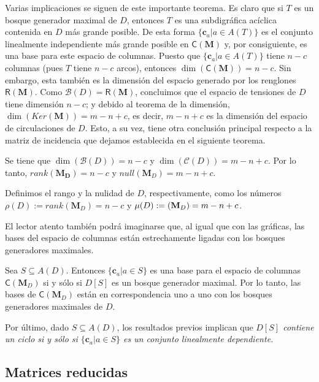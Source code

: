  Varias implicaciones se siguen de este importante teorema. Es claro que si $T$ es un bosque generador maximal de $D$, entonces $T$ es una subdigráfica acíclica contenida en $D$ más grande posible. De esta forma $\{\mathbf{c}_{a} | a \in A(T)\}$ es el conjunto linealmente independiente más grande posible en $\mathsf{C}(\mathbf{M})$ y, por consiguiente, es una base para este espacio de columnas. Puesto que $\{\mathbf{c}_{a} | a \in A(T)\}$ tiene $n-c$ columnas (pues $T$ tiene $n-c$ arcos), entonces $\dim(\mathsf{C}(\mathbf{M})) = n- c$. Sin embargo, esta también es la dimensión del espacio generado por los renglones $\mathsf{R}(\mathbf{M})$. Como $\mathcal{B}(D) = \mathsf{R}(\mathbf{M})$, concluimos que el espacio de tensiones de $D$ tiene dimensión $n - c$; y debido al teorema de la dimensión, \\$\dim(Ker(\mathbf{M}))= m - n + c$, es decir, $m - n + c$ es la dimensión del espacio de circulaciones de $D$. Esto, a su vez, tiene otra conclusión principal respecto a la matriz de incidencia que dejamos establecida en el siguiente teorema. 
 
 \begin{teo}
 Se tiene que $\dim(\mathcal{B}(D)) = n - c$ y $\dim(\mathcal{C}(D)) = m - n + c$. Por lo tanto, $rank(\mathbf{M_{D}}) = n - c$ y $null(\mathbf{M}_{D}) = m - n + c$.
 \end{teo}
 
 Definimos el rango y la nulidad de $D$, respectivamente, como los números $\rho(D):=rank(\mathbf{M}_{D}) = n -c$  y $\mu(D):=\null(\mathbf{M}_{D}) = m - n + c$.
 
 El lector atento también podrá imaginarse que, al igual que con las gráficas, las bases del espacio de columnas están estrechamente ligadas con los bosques generadores maximales.
 
\begin{cor} Sea $S\subseteq A(D)$. Entonces $\{\mathbf{c}_{a} | a \in S \}$ es una base para el espacio de columnas $\mathsf{C}(\mathbf{M}_{D})$ si y sólo si $D[S]$ es un bosque generador maximal. Por lo tanto, las bases de $\mathsf{C}(\mathbf{M}_{D})$ están en correspondencia uno a uno con los bosques generadores maximales de $D$.
\end{cor} 

Por último, dado $S \subseteq A(D)$, los resultados previos implican que \textit{$D[S]$ contiene un ciclo si y sólo si $\{\mathbf{c}_{a} | a \in S\}$ es un conjunto linealmente dependiente.} 

\subsection{Matrices reducidas}


